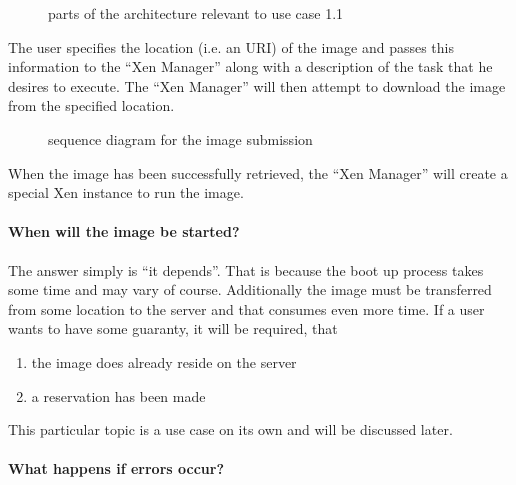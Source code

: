 \begin{figure}[htbp]
  \begin{center}
  \end{center}
  \caption[Architecture UC 1.1]{parts of the architecture relevant to use
    case 1.1}
  \label{fig:arch-uc-1.1}
\end{figure}

The user specifies the location (i.e. an URI) of the image and passes this
information to  the ``Xen Manager'' along  with a description  of the task
that  he desires  to execute.  The ``Xen  Manager'' will  then  attempt to
download the  image from the  specified location. 

\begin{figure}[htbp]
  \begin{center}
  \end{center}
  \caption[Sequence UC 1.1]{sequence diagram for the image submission}
  \label{fig:seq-uc-1.1}
\end{figure}

When the image  has been successfully retrieved, the  ``Xen Manager'' will
create  a  special  Xen  instance  to  run the  image.

\bigskip

\paragraph*{When will the image be started?}

The answer simply  is ``it depends''. That is because  the boot up process
takes some  time and may vary  of course.  Additionally the  image must be
transferred from some  location to the server and  that consumes even more
time. If a user wants to have some guaranty, it will be required, that
\begin{enumerate}
\item the image does already reside on the server
\item a reservation has been made
\end{enumerate}

This  particular topic is  a use  case on  its own  and will  be discussed
later.

\paragraph*{What happens if errors occur?}

